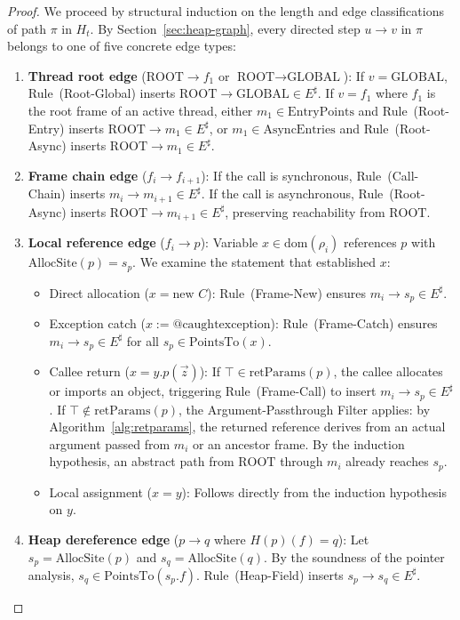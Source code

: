 \documentclass[12pt,a4paper]{article}
\newcommand{\GLOBAL}{\text{GLOBAL}}
\newcommand{\ROOT}{\text{ROOT}}
\newcommand{\PointsTo}{\text{PointsTo}}
\newcommand{\retParams}{\text{retParams}}
\begin{document}
\begin{proof}
We proceed by structural induction on the length and edge classifications of path $\pi$ in $H_t$. By Section~\ref{sec:heap-graph}, every directed step $u \to v$ in $\pi$ belongs to one of five concrete edge types:
\begin{enumerate}[leftmargin=*]
  \item \textbf{Thread root edge} ($\ROOT \to f_1$ or $\ROOT \to \GLOBAL$): If $v = \GLOBAL$, Rule~(Root-Global) inserts $\ROOT \to \GLOBAL \in E^\sharp$. If $v = f_1$ where $f_1$ is the root frame of an active thread, either $m_1 \in \text{EntryPoints}$ and Rule~(Root-Entry) inserts $\ROOT \to m_1 \in E^\sharp$, or $m_1 \in \text{AsyncEntries}$ and Rule~(Root-Async) inserts $\ROOT \to m_1 \in E^\sharp$.
  \item \textbf{Frame chain edge} ($f_i \to f_{i+1}$): If the call is synchronous, Rule~(Call-Chain) inserts $m_i \to m_{i+1} \in E^\sharp$. If the call is asynchronous, Rule~(Root-Async) inserts $\ROOT \to m_{i+1} \in E^\sharp$, preserving reachability from $\ROOT$.
  \item \textbf{Local reference edge} ($f_i \to p$): Variable $x \in \text{dom}(\rho_i)$ references $p$ with $\text{AllocSite}(p) = s_p$. We examine the statement that established $x$:
  \begin{itemize}
    \item Direct allocation ($x = \text{new } C$): Rule~(Frame-New) ensures $m_i \to s_p \in E^\sharp$.
    \item Exception catch ($x := @\text{caughtexception}$): Rule~(Frame-Catch) ensures $m_i \to s_p \in E^\sharp$ for all $s_p \in \PointsTo(x)$.
    \item Callee return ($x = y.p(\vec{z})$): If $\top \in \retParams(p)$, the callee allocates or imports an object, triggering Rule~(Frame-Call) to insert $m_i \to s_p \in E^\sharp$. If $\top \notin \retParams(p)$, the Argument-Passthrough Filter applies: by Algorithm~\ref{alg:retparams}, the returned reference derives from an actual argument passed from $m_i$ or an ancestor frame. By the induction hypothesis, an abstract path from $\ROOT$ through $m_i$ already reaches $s_p$.
    \item Local assignment ($x = y$): Follows directly from the induction hypothesis on $y$.
  \end{itemize}
  \item \textbf{Heap dereference edge} ($p \to q$ where $H(p)(f) = q$): Let $s_p = \text{AllocSite}(p)$ and $s_q = \text{AllocSite}(q)$. By the soundness of the pointer analysis, $s_q \in \PointsTo(s_p.f)$. Rule~(Heap-Field) inserts $s_p \to s_q \in E^\sharp$.

\end{enumerate}
\end{proof}
\end{document}
